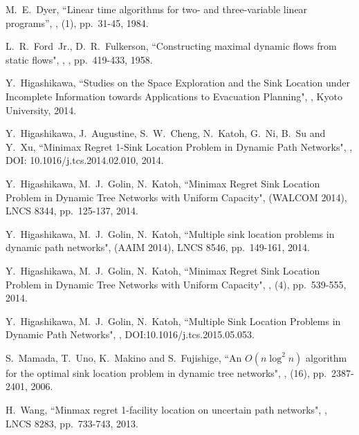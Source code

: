 \documentclass[a4paper]{llncs}
\begin{document}
\begin{thebibliography}{99}
	 M.~E.~Dyer, 
		\newblock ``Linear time algorithms for two- and three-variable linear programs'',
		,
		(1), pp.~31-45, 1984.
		
		L.~R.~Ford~Jr., D.~R.~Fulkerson,
		\newblock ``Constructing maximal dynamic flows from static flows",
		,
		, pp.~419-433, 1958.
	
		Y.~Higashikawa,
		\newblock ``Studies on the Space Exploration and the Sink Location under Incomplete Information towards Applications to Evacuation Planning",
		,
		\newblock Kyoto University, 2014.
			
		Y.~Higashikawa, J.~Augustine, S.~W.~Cheng, N.~Katoh, G.~Ni, B.~Su and Y.~Xu,
		\newblock ``Minimax Regret 1-Sink Location Problem in Dynamic Path Networks",
		,
		\newblock DOI: 10.1016/j.tcs.2014.02.010, 2014.
	
		Y.~Higashikawa, M.~J.~Golin, N.~Katoh,
		\newblock ``Minimax Regret Sink Location Problem in Dynamic Tree Networks with Uniform Capacity",
		 (WALCOM 2014),
		\newblock LNCS 8344, pp.~125-137, 2014.

		Y.~Higashikawa, M.~J.~Golin, N.~Katoh,
		\newblock ``Multiple sink location problems in dynamic path networks",
		 (AAIM 2014),
		\newblock LNCS 8546, pp.~149-161, 2014.
		
		Y.~Higashikawa, M.~J.~Golin, N.~Katoh,
		\newblock ``Minimax Regret Sink Location Problem in Dynamic Tree Networks with Uniform Capacity",
		,
		(4), pp.~539-555, 2014.

		Y.~Higashikawa, M.~J.~Golin, N.~Katoh,
		\newblock ``Multiple Sink Location Problems in Dynamic Path Networks",
		,
		\newblock DOI:10.1016/j.tcs.2015.05.053.
	






		S.~Mamada, T.~Uno, K.~Makino and S.~Fujishige,
		\newblock ``An $O(n \log^2 n)$ algorithm for the optimal sink location problem in dynamic tree networks",
		,
		(16), pp.~2387-2401, 2006. 





		H.~Wang, 
		\newblock ``Minmax regret 1-facility location on uncertain path networks",
		,
		\newblock LNCS 8283, pp.~733-743, 2013.

\end{thebibliography}
\end{document}

